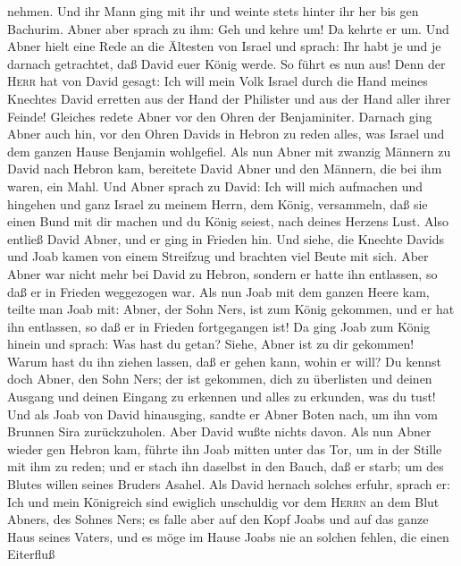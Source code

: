 nehmen.  Und ihr Mann ging mit ihr und weinte stets
hinter ihr her bis gen Bachurim. Abner aber sprach zu ihm: Geh und kehre
um! Da kehrte er um.  Und Abner hielt eine Rede an die
Ältesten von Israel und sprach: Ihr habt je und je darnach getrachtet,
daß David euer König werde. So führt es nun aus!  Denn
der \textsc{Herr} hat von David gesagt: Ich will mein Volk Israel durch
die Hand meines Knechtes David erretten aus der Hand der Philister und
aus der Hand aller ihrer Feinde!  Gleiches redete Abner
vor den Ohren der Benjaminiter. Darnach ging Abner auch hin, vor den
Ohren Davids in Hebron zu reden alles, was Israel und dem ganzen Hause
Benjamin wohlgefiel.  Als nun Abner mit zwanzig Männern
zu David nach Hebron kam, bereitete David Abner und den Männern, die bei
ihm waren, ein Mahl.  Und Abner sprach zu David: Ich will
mich aufmachen und hingehen und ganz Israel zu meinem Herrn, dem König,
versammeln, daß sie einen Bund mit dir machen und du König seiest, nach
deines Herzens Lust. Also entließ David Abner, und er ging in Frieden
hin.  Und siehe, die Knechte Davids und Joab kamen von
einem Streifzug und brachten viel Beute mit sich. Aber Abner war nicht
mehr bei David zu Hebron, sondern er hatte ihn entlassen, so daß er in
Frieden weggezogen war.  Als nun Joab mit dem ganzen
Heere kam, teilte man Joab mit: Abner, der Sohn Ners, ist zum König
gekommen, und er hat ihn entlassen, so daß er in Frieden fortgegangen
ist!  Da ging Joab zum König hinein und sprach: Was hast
du getan? Siehe, Abner ist zu dir gekommen! Warum hast du ihn ziehen
lassen, daß er gehen kann, wohin er will?  Du kennst doch
Abner, den Sohn Ners; der ist gekommen, dich zu überlisten und deinen
Ausgang und deinen Eingang zu erkennen und alles zu erkunden, was du
tust!  Und als Joab von David hinausging, sandte er Abner
Boten nach, um ihn vom Brunnen Sira zurückzuholen. Aber David wußte
nichts davon.  Als nun Abner wieder gen Hebron kam,
führte ihn Joab mitten unter das Tor, um in der Stille mit ihm zu reden;
und er stach ihn daselbst in den Bauch, daß er starb; um des Blutes
willen seines Bruders Asahel.  Als David hernach solches
erfuhr, sprach er: Ich und mein Königreich sind ewiglich unschuldig vor
dem \textsc{Herrn} an dem Blut Abners, des Sohnes Ners; 
es falle aber auf den Kopf Joabs und auf das ganze Haus seines Vaters,
und es möge im Hause Joabs nie an solchen fehlen, die einen Eiterfluß

